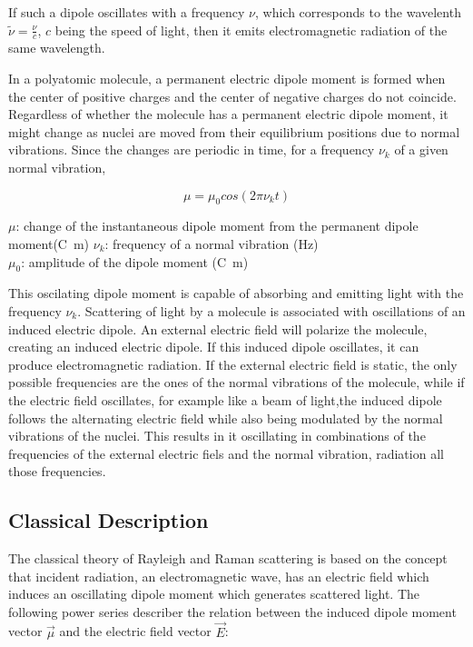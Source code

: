 If such a dipole oscillates with a frequency \(\nu\), which corresponds to the wavelenth \(\widetilde{\nu}=\frac{\nu}{c}\), \(c\) being the speed of light, then it emits electromagnetic radiation of the same wavelength.

\bigskip

In a polyatomic molecule, a permanent electric dipole moment is formed when the center of positive charges and the center of negative charges do not coincide. Regardless of whether the molecule has a permanent electric dipole moment, it might change as nuclei are moved from their equilibrium positions due to normal vibrations. Since the changes are periodic in time, for a frequency \(\nu_k\) of a given normal vibration, 

\begin{equation}
    \mu=\mu_0cos(2\pi\nu_kt)
\end{equation}

\(\mu\): change of the instantaneous dipole moment from the permanent dipole moment(\unit{\coulomb\meter})
\(\nu_k\): frequency of a normal vibration (\unit{\hertz})\\
\(\mu_0\): amplitude of the dipole moment (\unit{\coulomb\meter})

\bigskip

This oscilating dipole moment is capable of absorbing and emitting light with the frequency \(\nu_k\).
Scattering of light by a molecule is associated with oscillations of an induced electric dipole. An external electric field will polarize the molecule, creating an induced electric dipole. If this induced dipole oscillates, it can produce electromagnetic radiation. If the external electric field is static, the only possible frequencies are the ones of the normal vibrations of the molecule, while if the electric field oscillates, for example like a beam of light,the induced dipole follows the alternating electric field while also being modulated by the normal vibrations of the nuclei. This results in it oscillating in combinations of the frequencies of the external electric fiels and the normal vibration, radiation all those frequencies. \cite{theory1}

\subsection{Classical Description}


The classical theory of Rayleigh and Raman scattering is based on the concept that incident radiation, an electromagnetic wave, has an electric field which induces an oscillating dipole moment which generates scattered light. The following power series describer the relation between the induced dipole moment vector \(\overrightarrow{\mu} \) and the electric field vector \(\overrightarrow{E} \): 

